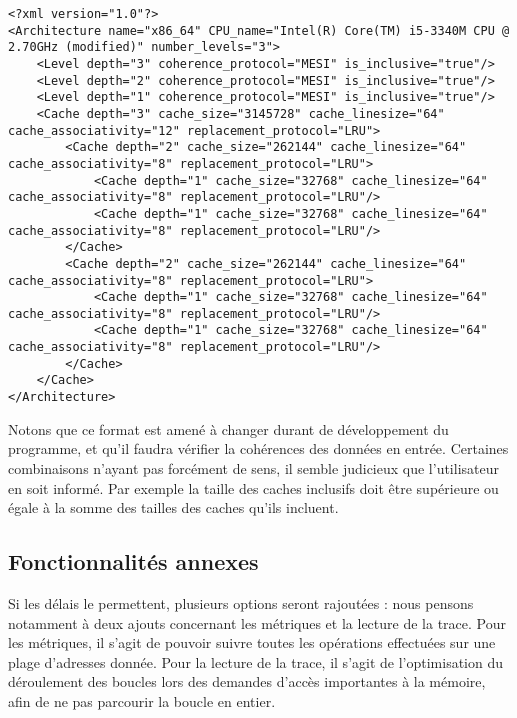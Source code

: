 \begin{lstlisting}
<?xml version="1.0"?>
<Architecture name="x86_64" CPU_name="Intel(R) Core(TM) i5-3340M CPU @ 2.70GHz (modified)" number_levels="3">
    <Level depth="3" coherence_protocol="MESI" is_inclusive="true"/>
    <Level depth="2" coherence_protocol="MESI" is_inclusive="true"/>
    <Level depth="1" coherence_protocol="MESI" is_inclusive="true"/>
    <Cache depth="3" cache_size="3145728" cache_linesize="64" cache_associativity="12" replacement_protocol="LRU">
        <Cache depth="2" cache_size="262144" cache_linesize="64" cache_associativity="8" replacement_protocol="LRU">
            <Cache depth="1" cache_size="32768" cache_linesize="64" cache_associativity="8" replacement_protocol="LRU"/>
            <Cache depth="1" cache_size="32768" cache_linesize="64" cache_associativity="8" replacement_protocol="LRU"/>
        </Cache>
        <Cache depth="2" cache_size="262144" cache_linesize="64" cache_associativity="8" replacement_protocol="LRU">
            <Cache depth="1" cache_size="32768" cache_linesize="64" cache_associativity="8" replacement_protocol="LRU"/>
            <Cache depth="1" cache_size="32768" cache_linesize="64" cache_associativity="8" replacement_protocol="LRU"/>
        </Cache>
    </Cache>
</Architecture>
\end{lstlisting}

Notons que ce format est amené à changer durant de développement du programme, et qu'il faudra vérifier la cohérences des données en entrée. Certaines combinaisons n'ayant pas forcément de sens, il semble judicieux que l'utilisateur en soit informé. Par exemple la taille des caches inclusifs doit être supérieure ou égale à la somme des tailles des caches qu'ils incluent.

\subsection{Fonctionnalités annexes}

Si les délais le permettent, plusieurs options seront rajoutées : nous pensons notamment à deux ajouts concernant les métriques et la lecture de la trace. Pour les métriques, il s'agit de pouvoir suivre toutes les opérations effectuées sur une plage d'adresses donnée. Pour la lecture de la trace, il s'agit de l'optimisation du déroulement des boucles lors des demandes d'accès importantes à la mémoire, afin de ne pas parcourir la boucle en entier.
